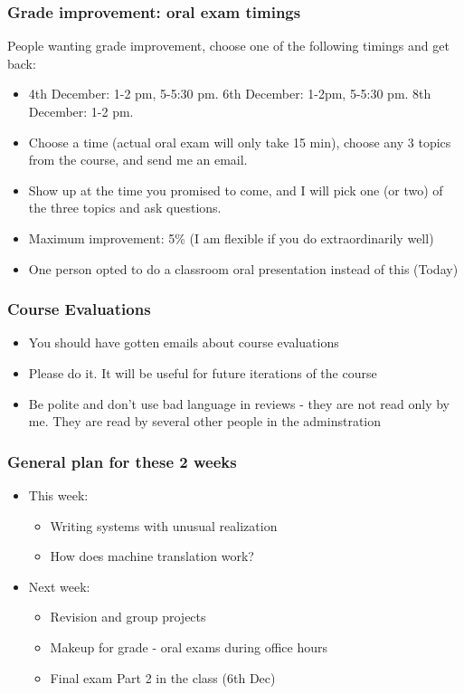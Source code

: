 \documentclass{beamer}
\begin{document}
\begin{frame}
\frametitle{Grade improvement: oral exam timings}
People wanting grade improvement, choose one of the following timings and get back:
\begin{itemize}
\item 4th December: 1-2 pm, 5-5:30 pm. 6th December: 1-2pm, 5-5:30 pm. 8th December: 1-2 pm.
\item Choose a time (actual oral exam will only take 15 min), choose any 3 topics from the course, and send me an email.
\item Show up at the time you promised to come, and I will pick one (or two) of the three topics and ask questions.
\item Maximum improvement: 5\% (I am flexible if you do extraordinarily well)
\item One person opted to do a classroom oral presentation instead of this (Today)
\end{itemize}
\end{frame}

\begin{frame}
\frametitle{Course Evaluations}
\begin{itemize}
\item You should have gotten emails about course evaluations
\item Please do it. It will be useful for future iterations of the course
\item Be polite and don't use bad language in reviews - they are not read only by me. They are read by several other people in the adminstration
\end{itemize}
\end{frame}

\begin{frame}
\frametitle{General plan for these 2 weeks}
\begin{itemize}
\item This week:
\begin{itemize}
\item Writing systems with unusual realization
\item How does machine translation work?
\end{itemize}
\item Next week:
\begin{itemize}
\item Revision and group projects
\item Makeup for grade - oral exams during office hours
\item Final exam Part 2 in the class (6th Dec)
\end{itemize}
\end{itemize}
\end{frame}
\end{document}
